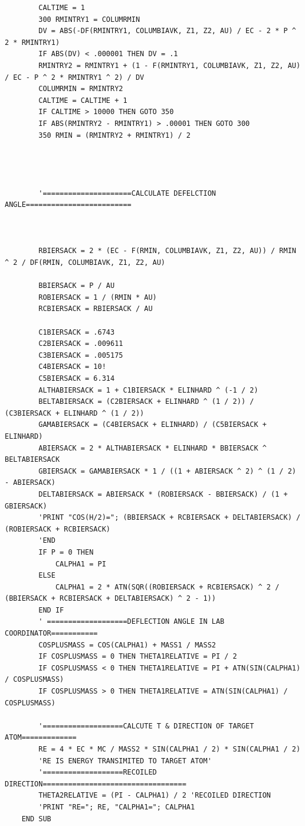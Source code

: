 \documentclass[10pt, reqno]{exam}
\begin{document}
\begin{verbatim}
        CALTIME = 1
        300 RMINTRY1 = COLUMRMIN
        DV = ABS(-DF(RMINTRY1, COLUMBIAVK, Z1, Z2, AU) / EC - 2 * P ^ 2 * RMINTRY1)
        IF ABS(DV) < .000001 THEN DV = .1
        RMINTRY2 = RMINTRY1 + (1 - F(RMINTRY1, COLUMBIAVK, Z1, Z2, AU) / EC - P ^ 2 * RMINTRY1 ^ 2) / DV
        COLUMRMIN = RMINTRY2
        CALTIME = CALTIME + 1
        IF CALTIME > 10000 THEN GOTO 350
        IF ABS(RMINTRY2 - RMINTRY1) > .00001 THEN GOTO 300
        350 RMIN = (RMINTRY2 + RMINTRY1) / 2
    
    
    
    
        '=====================CALCULATE DEFELCTION ANGLE=========================
    
    
    
        RBIERSACK = 2 * (EC - F(RMIN, COLUMBIAVK, Z1, Z2, AU)) / RMIN ^ 2 / DF(RMIN, COLUMBIAVK, Z1, Z2, AU)
    
        BBIERSACK = P / AU
        ROBIERSACK = 1 / (RMIN * AU)
        RCBIERSACK = RBIERSACK / AU
    
        C1BIERSACK = .6743
        C2BIERSACK = .009611
        C3BIERSACK = .005175
        C4BIERSACK = 10!
        C5BIERSACK = 6.314
        ALTHABIERSACK = 1 + C1BIERSACK * ELINHARD ^ (-1 / 2)
        BELTABIERSACK = (C2BIERSACK + ELINHARD ^ (1 / 2)) / (C3BIERSACK + ELINHARD ^ (1 / 2))
        GAMABIERSACK = (C4BIERSACK + ELINHARD) / (C5BIERSACK + ELINHARD)
        ABIERSACK = 2 * ALTHABIERSACK * ELINHARD * BBIERSACK ^ BELTABIERSACK
        GBIERSACK = GAMABIERSACK * 1 / ((1 + ABIERSACK ^ 2) ^ (1 / 2) - ABIERSACK)
        DELTABIERSACK = ABIERSACK * (ROBIERSACK - BBIERSACK) / (1 + GBIERSACK)
        'PRINT "COS(H/2)="; (BBIERSACK + RCBIERSACK + DELTABIERSACK) / (ROBIERSACK + RCBIERSACK)
        'END
        IF P = 0 THEN
            CALPHA1 = PI
        ELSE
            CALPHA1 = 2 * ATN(SQR((ROBIERSACK + RCBIERSACK) ^ 2 / (BBIERSACK + RCBIERSACK + DELTABIERSACK) ^ 2 - 1))
        END IF
        ' ===================DEFLECTION ANGLE IN LAB COORDINATOR===========
        COSPLUSMASS = COS(CALPHA1) + MASS1 / MASS2
        IF COSPLUSMASS = 0 THEN THETA1RELATIVE = PI / 2
        IF COSPLUSMASS < 0 THEN THETA1RELATIVE = PI + ATN(SIN(CALPHA1) / COSPLUSMASS)
        IF COSPLUSMASS > 0 THEN THETA1RELATIVE = ATN(SIN(CALPHA1) / COSPLUSMASS)
    
        '===================CALCUTE T & DIRECTION OF TARGET ATOM=============
        RE = 4 * EC * MC / MASS2 * SIN(CALPHA1 / 2) * SIN(CALPHA1 / 2)
        'RE IS ENERGY TRANSIMITED TO TARGET ATOM'
        '===================RECOILED DIRECTION==================================
        THETA2RELATIVE = (PI - CALPHA1) / 2 'RECOILED DIRECTION
        'PRINT "RE="; RE, "CALPHA1="; CALPHA1
    END SUB
    

\end{verbatim}
\end{document}
